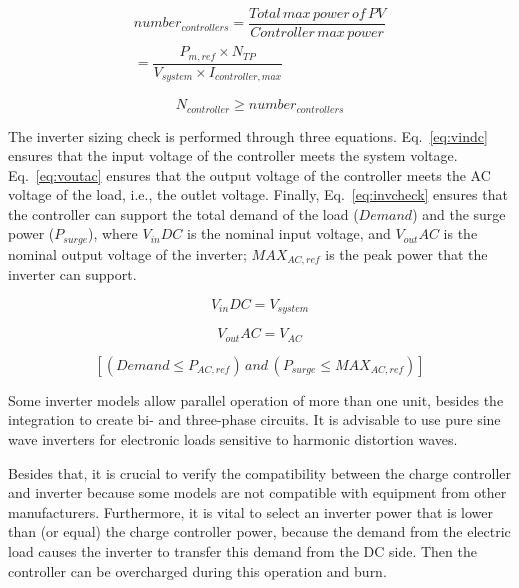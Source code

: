 \documentclass[10pt,journal,compsoc]{IEEEtran}
\begin{document}
\begin{equation}
\label{eq:numberofcmin}
\begin{split}
number_{controllers} = \dfrac{Total \, max \, power \, of \, PV}{Controller \, max \, power} \\ = \dfrac{P_{m,ref} \times N_{TP}}{V_{system} \times I_{controller,max}}
\end{split}
\end{equation}

\begin{equation}
\label{eq:numberofc}
N_{controller} \geq number_{controllers}
\end{equation}

The inverter sizing check is performed through three equations. Eq.~\eqref{eq:vindc} ensures that the input voltage of the controller meets the system voltage. Eq.~\eqref{eq:voutac} ensures that the output voltage of the controller meets the AC voltage of the load, i.e., the outlet voltage. Finally, Eq.~\eqref{eq:invcheck} ensures that the controller can support the total demand of the load ($Demand$) and the surge power ($P_{surge}$), where $V_{in}DC$ is the nominal input voltage, and $V_{out}AC$ is the nominal output voltage of the inverter; $MAX_{AC,ref}$ is the peak power that the inverter can support.

\begin{equation}
\label{eq:vindc} 
V_{in}DC = V_{system}
\end{equation}

\begin{equation}
\label{eq:voutac} 
V_{out}AC = V_{AC}
\end{equation}

\begin{equation}
\label{eq:invcheck} 
\left[ (Demand \leq P_{AC,ref}) \, and \, (P_{surge} \leq MAX_{AC,ref}) \right]
\end{equation}

Some inverter models allow parallel operation of more than one unit, besides the integration to create bi- and three-phase circuits. It is advisable to use pure sine wave inverters for electronic loads sensitive to harmonic distortion waves.

Besides that, it is crucial to verify the compatibility between the charge controller and inverter because some models are not compatible with equipment from other manufacturers. Furthermore, it is vital to select an inverter power that is lower than (or equal) the charge controller power, because the demand from the electric load causes the inverter to transfer this demand from the DC side. Then the controller can be overcharged during this operation and burn.



\end{document}
